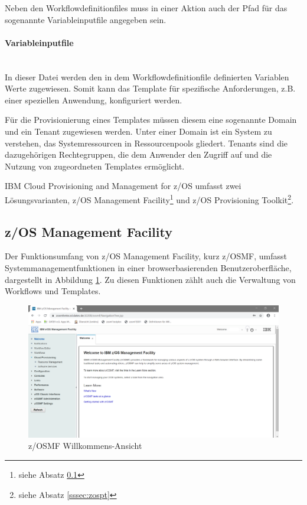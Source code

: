 Neben den Workflowdefinitionfiles muss in einer Aktion auch der Pfad für das sogenannte \glqq Variableinputfile\grqq{} angegeben sein.
\cite{.26.2.2020}

\paragraph{\glqq Variableinputfile\grqq}\label{par:variable} ~\\
In dieser Datei werden den in dem Workflowdefinitionfile definierten Variablen Werte zugewiesen.
Somit kann das Template für spezifische Anforderungen, z.B. einer speziellen Anwendung,  konfiguriert werden.

Für die Provisionierung eines Templates müssen diesem eine sogenannte \glqq Domain\grqq{} und ein \glqq Tenant\grqq{} zugewiesen werden.
Unter einer Domain ist ein System zu verstehen, das Systemressourcen in Ressourcenpools gliedert.
Tenants sind die dazugehörigen Rechtegruppen, die dem Anwender den Zugriff auf und die Nutzung von zugeordneten Templates ermöglicht.
\cite[S. 15]{Keith.2016}

\glqq IBM Cloud Provisioning and Management for z/OS\grqq{} umfasst zwei Lösungsvarianten, \glqq z/OS Management Facility\grqq\footnote{siehe Absatz \ref{sssec:zosmf}} und \glqq z/OS Provisioning Toolkit\grqq\footnote{siehe Absatz \ref{sssec:zospt}}.

\subsection{z/OS Management Facility}\label{sssec:zosmf}
Der Funktionsumfang von z/OS Management Facility, kurz z/OSMF, umfasst Systemmanagementfunktionen
in einer browserbasierenden Benutzeroberfläche, dargestellt in Abbildung \ref{fig:zosmf_welcome}.
Zu diesen Funktionen zählt auch die Verwaltung von Workflows und Templates.

\begin{figure}[h]
\centering
\includegraphics[width=\textwidth]{figures/zosmf.png}
\caption{z/OSMF Willkommens-Ansicht}
\label{fig:zosmf_welcome}
\end{figure}

